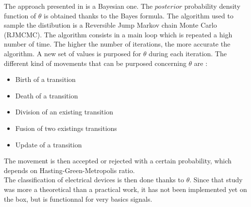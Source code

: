 The approach presented in \cite{research2} is a Bayesian one. The $posterior$ probability density function of $\theta$ is obtained thanks to the Bayes formula. The algorithm used to sample the distibution is a Reversible Jump Markov chain Monte Carlo (RJMCMC). The algorithm consists in a main loop which is repeated a high number of time. The higher the number of iterations, the more accurate the algorithm. A new set of values is purposed for $\theta$ during each iteration. The different kind of movements that can be purposed concerning $\theta$ are :
\begin{itemize}
\item Birth of a transition
\item Death of a transition
\item Division of an existing transition
\item Fusion of two existings transitions
\item Update of a transition
\end{itemize}
The movement is then accepted or rejected with a certain probability, which depends on Hasting-Green-Metropolis ratio. 
\\

The classification of electrical devices is then done thanks to $\theta$. Since that study was more a theoretical than a practical work, it has not been implemented yet on the box, but is functionnal for very basics signals.

